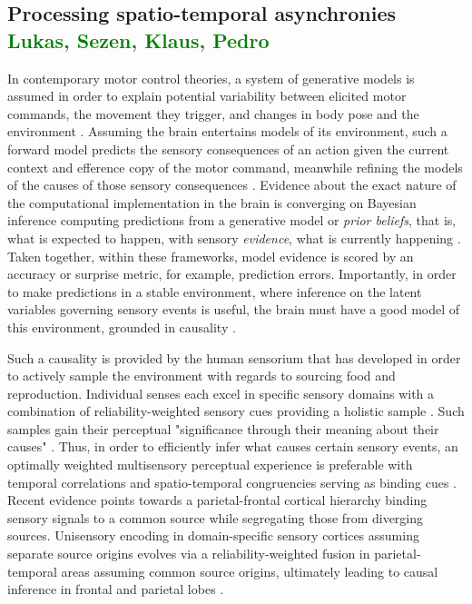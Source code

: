 \subsection{Processing spatio-temporal asynchronies \textcolor{green}{Lukas, Sezen, Klaus, Pedro}}
In contemporary motor control theories, a system of generative models is assumed in order to explain potential variability between elicited motor commands, the movement they trigger, and changes in body pose and the environment \cite{Wolpert2011, Shadmehr2010}. Assuming the brain entertains models of its environment, such a forward model predicts the sensory consequences of an action given the current context and efference copy of the motor command, meanwhile refining the models of the causes of those sensory consequences \cite{Pearson2011, Friston2010, Friston2016a}. Evidence about the exact nature of the computational implementation in the brain is converging on Bayesian inference computing predictions from a generative model or \textit{prior beliefs}, that is, what is expected to happen, with sensory \textit{evidence}, what is currently happening \cite{Knill2004}. Taken together, within these frameworks, model evidence is scored by an accuracy or surprise metric, for example, prediction errors. Importantly, in order to make predictions in a stable environment, where inference on the latent variables governing sensory events is useful, the brain must have a good model of this environment, grounded in causality \cite{Friston2016a}.

Such a causality is provided by the human sensorium that has developed in order to actively sample the environment with regards to sourcing food and reproduction. Individual senses each excel in specific sensory domains with a combination of reliability-weighted sensory cues providing a holistic sample \cite{Fetsch2012, Cao2019}. Such samples gain their perceptual "significance through their meaning about their causes" \cite{Kording2007}. Thus, in order to efficiently infer what causes certain sensory events, an optimally weighted multisensory perceptual experience is preferable with temporal correlations and spatio-temporal congruencies serving as binding cues \cite{Robertson2003}. Recent evidence points towards a parietal-frontal cortical hierarchy binding sensory signals to a common source while segregating those from diverging sources. Unisensory encoding in domain-specific sensory cortices assuming separate source origins evolves via a reliability-weighted fusion in parietal-temporal areas assuming common source origins, ultimately leading to causal inference in frontal and parietal lobes \cite{Cao2019, Rohe2019}.

